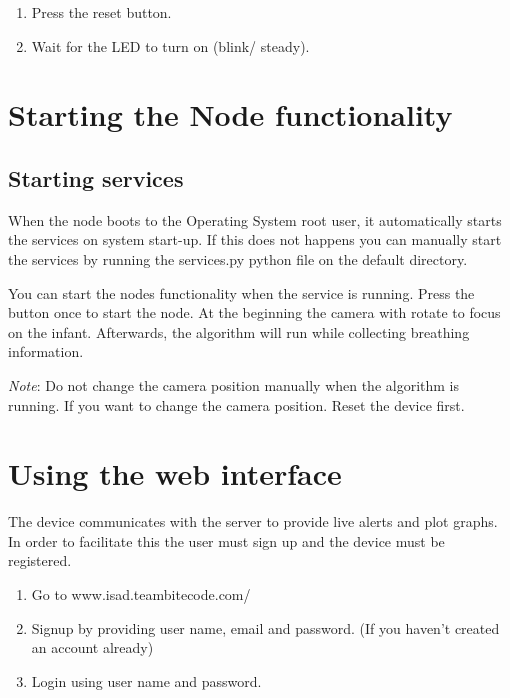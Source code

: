 \documentclass{article}
\begin{document}
\begin{enumerate}

  \item Press the reset button.
  \item Wait for the LED to turn on (blink/ steady).
  
\end{enumerate}


\section{Starting the Node functionality}
\subsection{Starting services}

When the node boots to the Operating System root user, it automatically starts the services on system start-up. If this does not happens you can manually start the services by running the services.py python file on the default directory.
\newline
\newline

You can start the nodes functionality when the service is running. Press the button once to start the node. At the beginning the camera with rotate to focus on the infant. Afterwards, the algorithm will run while collecting breathing information.

\newline
\newline
\emph{Note}: Do not change the camera position manually when the algorithm is running. If you want to change the camera position. Reset the device first.

\section{Using the web interface}

The device communicates with the server to provide live alerts and plot graphs. In order to facilitate this the user must sign up and the device must be registered.

\begin{enumerate}

  \item Go to www.isad.teambitecode.com/                         
  \item Signup by providing user name, email and password. (If you haven't created an account already)
  \item Login using user name and password.

\end{enumerate}
\end{document}
